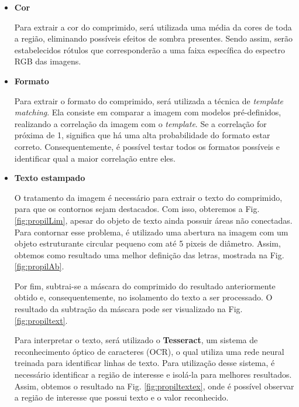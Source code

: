 \begin{itemize}
    \item \textbf{Cor}
    
    Para extrair a cor do comprimido, será utilizada uma média da cores de toda a região, eliminando possíveis efeitos de sombra presentes. Sendo assim, serão estabelecidos rótulos que corresponderão a uma faixa específica do espectro RGB das imagens.
    
    \item \textbf{Formato}
    
    Para extrair o formato do comprimido, será utilizada a técnica de \textit{template matching}. Ela consiste em comparar a imagem com modelos pré-definidos, realizando a correlação da imagem com o \textit{template}. Se a correlação for próxima de 1, significa que há uma alta probabilidade do formato estar correto. Consequentemente, é possível testar todos os formatos possíveis e identificar qual a maior correlação entre eles.
    
    \item \textbf{Texto estampado}
    
   O tratamento da imagem é necessário para extrair o texto do comprimido, para que os contornos sejam destacados. Com isso, obteremos a Fig. \ref{fig:propilLim}, apesar do objeto de texto ainda possuir áreas não conectadas. Para contornar esse problema, é utilizado uma abertura na imagem com um objeto estruturante circular pequeno com até 5 pixeis de diâmetro. Assim, obtemos como resultado uma melhor definição das letras, mostrada na Fig. \ref{fig:propilAb}.
    
    Por fim, subtrai-se a máscara do comprimido do resultado anteriormente obtido e, consequentemente, no isolamento do texto a ser processado. O resultado da subtração da máscara pode ser visualizado na Fig. \ref{fig:propiltext}.
    
    Para interpretar o texto, será utilizado o \textbf{Tesseract}, um sistema de reconhecimento óptico de caracteres (OCR), o qual utiliza uma rede neural treinada para identificar linhas de texto. Para utilização desse sistema, é necessário identificar a região de interesse e isolá-la para melhores resultados. Assim, obtemos o resultado na Fig. \ref{fig:propiltextex}, onde é possível observar a região de interesse que possui texto e o valor reconhecido.
    

\end{itemize}
